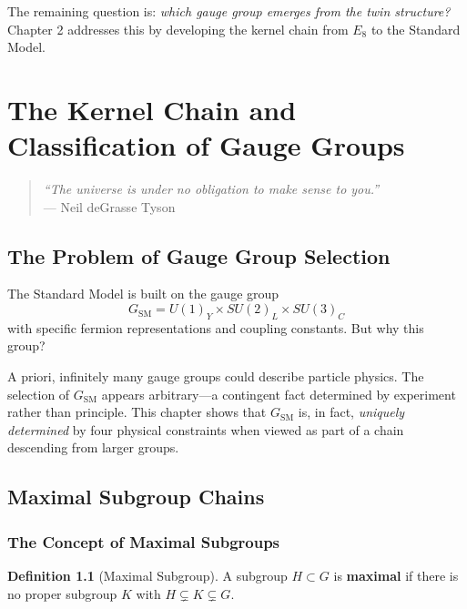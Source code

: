 \documentclass[11pt,a4paper,openright]{book}
\theoremstyle{plain}
\theoremstyle{definition}
\newtheorem{definition}[theorem]{Definition}
\newcommand{\SM}{\mathrm{SM}}
\begin{document}
The remaining question is: \emph{which gauge group emerges from the twin structure?} Chapter 2 addresses this by developing the kernel chain from $E_8$ to the Standard Model.

\chapter{The Kernel Chain and Classification of Gauge Groups}
\label{ch:kernel-chains}

\begin{quote}
\textit{``The universe is under no obligation to make sense to you.''}\\
--- Neil deGrasse Tyson
\end{quote}

\section{The Problem of Gauge Group Selection}

The Standard Model is built on the gauge group
\begin{equation}
G_{\SM} = U(1)_Y \times SU(2)_L \times SU(3)_C
\end{equation}
with specific fermion representations and coupling constants. But why this group?

A priori, infinitely many gauge groups could describe particle physics. The selection of $G_{\SM}$ appears arbitrary---a contingent fact determined by experiment rather than principle. This chapter shows that $G_{\SM}$ is, in fact, \emph{uniquely determined} by four physical constraints when viewed as part of a chain descending from larger groups.

\section{Maximal Subgroup Chains}

\subsection{The Concept of Maximal Subgroups}

\begin{definition}[Maximal Subgroup]
A subgroup $H \subset G$ is \textbf{maximal} if there is no proper subgroup $K$ with $H \subsetneq K \subsetneq G$.
\end{definition}
\end{document}
